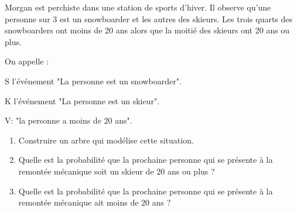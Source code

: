 
Morgan est perchiste dans une station de sports d'hiver. Il observe qu'une personne sur 3 est un snowboarder et les autres des skieurs. Les trois quarts des snowboarders ont moins de 20 ans alors que la moitié des skieurs ont 20 ans ou plus.

On appelle :
 \begin{description}
  \item S l'événement "La personne est un snowboarder".
  \item K l'événement "La personne est un skieur".
  \item V: "la personne a moins de 20 ans".
  \end{description} 

\begin{enumerate}
\item Construire un arbre qui modélise cette situation.

\item Quelle est la probabilité que la prochaine personne qui se présente à la remontée mécanique soit un skieur de 20 ans ou plus ?
\item Quelle est la probabilité que la prochaine personne qui se présente à la remontée mécanique ait moins de 20 ans ? 
\end{enumerate}








